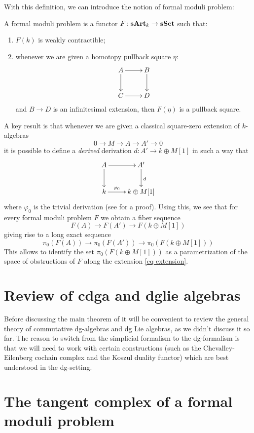 \begin{refsection}
With this definition, we can introduce the notion of formal moduli problem:

\begin{defin}
A formal moduli problem is a functor $F \colon \mathbf{sArt}_k \to \mathbf{sSet}$ such that:
\begin{enumerate}
\item $F(k)$ is weakly contractible;
\item whenever we are given a homotopy pullback square $\eta$:
\[
\xymatrix{
A \ar[r] \ar[d] & B \ar[d] \\ C \ar[r] & D
}
\]
and $B \to D$ is an infinitesimal extension, then $F(\eta)$ is a pullback square.
\end{enumerate}
\end{defin}

A key result is that whenever we are given a classical square-zero extension of $k$-algebras
\begin{equation} \label{eq extension}
0 \to M \to A \to A' \to 0
\end{equation}
it is possible to define a \emph{derived} derivation $d \colon A' \to k \oplus M[1]$ in such a way that
\[
\xymatrix{
A \ar[r] \ar[d] & A' \ar[d]^d \\ k \ar[r]^-{\varphi_0} & k \oplus M[1]
}
\]
where $\varphi_0$ is the trivial derivation (see \cite[Lemma 6.2]{infinitesimalextension} for a proof). Using this, we see that for every formal moduli problem $F$ we obtain a fiber sequence
\[
F(A) \to F(A') \to F(k \oplus M[1])
\]
giving rise to a long exact sequence
\[
\pi_0(F(A)) \to \pi_0(F(A')) \to \pi_0(F(k \oplus M[1]))
\]
This allows to identify the set $\pi_0(F(k \oplus M[1]))$ as a parametrization of the space of obstructions of $F$ along the extension \eqref{eq extension}.

\section{Review of cdga and dglie algebras}

Before discussing the main theorem of \cite{dagx} it will be convenient to review the general theory of commutative dg-algebras and dg Lie algebras, as we didn't discuss it so far. The reason to switch from the simplicial formalism to the dg-formalism is that we will need to work with certain constructions (such as the Chevalley-Eilenberg cochain complex and the Koszul duality functor) which are best understood in the dg-setting.

\section{The tangent complex of a formal moduli problem}

\printbibliography[heading = local]

\end{refsection}
